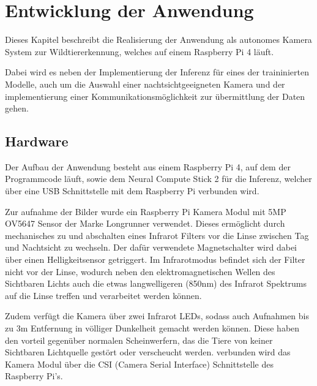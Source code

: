
\chapter{Entwicklung der Anwendung}\label{kap:application}

Dieses Kapitel beschreibt die Realisierung der Anwendung 
als autonomes Kamera System zur
Wildtiererkennung, welches auf einem Raspberry Pi 4 läuft.

Dabei wird es neben der Implementierung der Inferenz für eines der 
traininierten Modelle, auch um die Auswahl einer 
nachtsichtgeeigneten Kamera und der implementierung 
einer Kommunikationsmöglichkeit zur übermittlung 
der Daten gehen.



\section{Hardware}\label{sec:aufbau}


Der Aufbau der Anwendung besteht aus einem Raspberry Pi 4, auf dem 
der Programmcode läuft, sowie dem Neural Compute Stick 2
für die Inferenz, welcher über eine USB Schnittstelle
mit dem Raspberry Pi verbunden wird.

Zur aufnahme der Bilder wurde ein Raspberry Pi Kamera Modul mit 
5MP OV5647 Sensor der Marke Longrunner verwendet.
Dieses ermöglicht durch mechanisches zu und abschalten eines Infrarot 
Filters vor die Linse zwischen Tag und Nachtsicht zu wechseln.
Der dafür verwendete Magnetschalter wird dabei über einen 
Helligkeitsensor getriggert.
Im Infrarotmodus befindet sich der Filter nicht 
vor der Linse, wodurch neben den elektromagnetischen 
Wellen des Sichtbaren Lichts auch die etwas langwelligeren 
(850nm) des Infrarot Spektrums auf die Linse treffen und 
verarbeitet werden können.

Zudem verfügt die Kamera über zwei Infrarot LEDs, 
sodass auch Aufnahmen bis zu 3m Entfernung
in völliger Dunkelheit gemacht werden können. Diese haben 
den vorteil gegenüber normalen Scheinwerfern, 
das die Tiere von keiner Sichtbaren Lichtquelle 
gestört oder verscheucht werden.
verbunden wird das Kamera Modul über die CSI 
(Camera Serial Interface) 
Schnittstelle des Raspberry Pi's.
\vspace{1cm}



